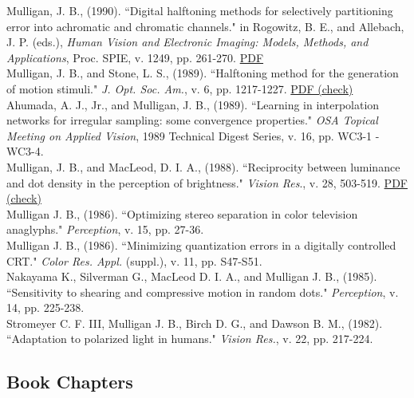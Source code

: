 \documentclass[12pt]{article}
\newcommand{\years}[1]{\marginnote{\scriptsize #1}}
\begin{document}
Mulligan, J. B., (1990).
``Digital halftoning methods for selectively partitioning
error into achromatic and chromatic channels."
in Rogowitz, B. E., and Allebach, J. P. (eds.),
\emph{Human Vision and Electronic Imaging:  Models, Methods, and Applications},
Proc. SPIE, v. 1249,
pp. 261-270.  \href{https://hsi.arc.nasa.gov/publications/spie90.pdf}{PDF}\\

\years{1989}
Mulligan, J. B., and Stone, L. S., (1989).
``Halftoning method for the generation of motion stimuli."
\emph{J. Opt. Soc. Am.}, v. 6, pp. 1217-1227.  \href{https://hsi.arc.nasa.gov/publications/josa89.pdf}{PDF (check)}\\

Ahumada, A. J., Jr., and Mulligan, J. B., (1989).
``Learning in interpolation networks for irregular sampling: some convergence properties."
\emph{OSA Topical Meeting on Applied Vision},
1989 Technical Digest Series,  v. 16, pp. WC3-1 - WC3-4.\\

\years{1988}
Mulligan, J. B., and MacLeod, D. I. A., (1988).
``Reciprocity between luminance and dot density in the perception of brightness."
\emph{Vision Res}., v. 28, 503-519.  \href{http://hsi.arc.nasa.gov/publications/vr88.pdf}{PDF (check)}\\

\years{1986}
Mulligan J. B., (1986).
``Optimizing stereo separation in color television anaglyphs."
\emph{Perception}, v. 15, pp. 27-36.\\

Mulligan J. B., (1986).
``Minimizing quantization errors in a digitally controlled CRT."
\emph{Color Res. Appl.} (suppl.), v. 11, pp. S47-S51.\\

\clearpage
\years{1985}
Nakayama K., Silverman G., MacLeod D. I. A., and Mulligan J. B., (1985).
``Sensitivity to shearing and compressive motion in random dots."
\emph{Perception}, v. 14, pp. 225-238.\\

\years{1982}
Stromeyer C. F. III, Mulligan J. B., Birch D. G., and Dawson B. M., (1982).
``Adaptation to polarized light in humans."
\emph{Vision Res.}, v. 22, pp. 217-224.\\

\subsection*{Book Chapters}
\noindent
\end{document}
